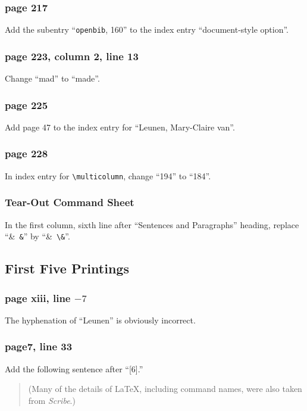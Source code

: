 \subsubsection*{page 217}
Add the subentry ``{\tt openbib}, 160'' to the index entry
``document-style option''.
 
 
\subsubsection*{page 223, column 2, line 13}
Change ``mad'' to ``made''.
 
\subsubsection*{page 225}
Add page 47 to the index entry for ``Leunen, Mary-Claire van''.
 
\subsubsection*{page 228}
In index entry for \verb|\multicolumn|, change ``194''
to ``184''.
 
 
\subsubsection*{Tear-Out Command Sheet}
 
In the first column, sixth line after ``Sentences and Paragraphs'' heading, 
replace ``\hbox{\& \verb|&|}'' by ``\hbox{\& \verb|\&|}''.
 
\subsection{First Five Printings}
 
\subsubsection*{page xiii, line $-7$}
The hyphenation of ``Leunen'' is obviously incorrect.
 
\subsubsection*{page7, line 33}
Add the following sentence after ``[6].''
\begin{quote}
(Many of the details of \LaTeX, including command names, were also
taken from {\em Scribe}.)
\end{quote}
 
